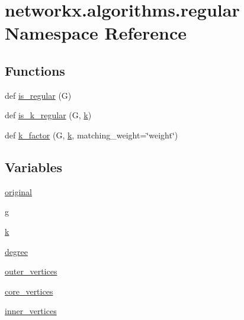 \hypertarget{namespacenetworkx_1_1algorithms_1_1regular}{}\section{networkx.\+algorithms.\+regular Namespace Reference}
\label{namespacenetworkx_1_1algorithms_1_1regular}
\subsection*{Functions}
\begin{DoxyCompactItemize}
\item 
def \hyperlink{namespacenetworkx_1_1algorithms_1_1regular_abae34f97d8b60cf592b0df161f5787cd}{is\+\_\+regular} (G)
\item 
def \hyperlink{namespacenetworkx_1_1algorithms_1_1regular_a988c180a3c8476a8c24dc9b9687ecf4a}{is\+\_\+k\+\_\+regular} (G, \hyperlink{namespacenetworkx_1_1algorithms_1_1regular_a760c57bc8e7607a54a414313bc7bea73}{k})
\item 
def \hyperlink{namespacenetworkx_1_1algorithms_1_1regular_a5835cb58b6f4dc08101480865a67df98}{k\+\_\+factor} (G, \hyperlink{namespacenetworkx_1_1algorithms_1_1regular_a760c57bc8e7607a54a414313bc7bea73}{k}, matching\+\_\+weight=\char`\"{}weight\char`\"{})
\end{DoxyCompactItemize}
\subsection*{Variables}
\begin{DoxyCompactItemize}
\item 
\hyperlink{namespacenetworkx_1_1algorithms_1_1regular_a3fd9042d6bf160d484d365d1cf81bb29}{original}
\item 
\hyperlink{namespacenetworkx_1_1algorithms_1_1regular_ae9b11c353fc115aeb332e152194ede89}{g}
\item 
\hyperlink{namespacenetworkx_1_1algorithms_1_1regular_a760c57bc8e7607a54a414313bc7bea73}{k}
\item 
\hyperlink{namespacenetworkx_1_1algorithms_1_1regular_afb35ddfd995ddf36924ad01374efc296}{degree}
\item 
\hyperlink{namespacenetworkx_1_1algorithms_1_1regular_a30148ad0c5b8423fa4848f796cda5ca4}{outer\+\_\+vertices}
\item 
\hyperlink{namespacenetworkx_1_1algorithms_1_1regular_a8cce5ad9b2df06aa5fd0b7496379265e}{core\+\_\+vertices}
\item 
\hyperlink{namespacenetworkx_1_1algorithms_1_1regular_aae7b6ff66ef0ada4e66bd03dfa329082}{inner\+\_\+vertices}
\end{DoxyCompactItemize}


